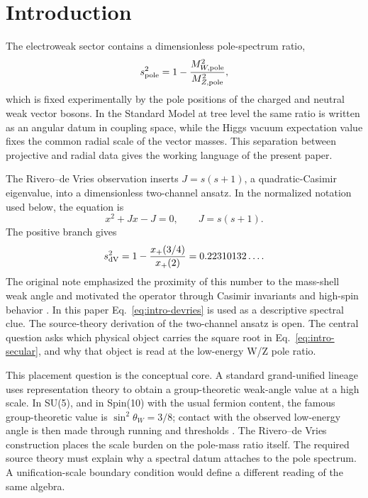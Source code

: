 \section{Introduction}
\label{sec:introduction}

The electroweak sector contains a dimensionless pole-spectrum ratio,
\begin{equation}
  s^2_{\rm pole} = 1-\frac{M_{W,\rm pole}^2}{M_{Z,\rm pole}^2},
  \label{eq:pole-angle-intro}
\end{equation}
which is fixed experimentally by the pole positions of the charged and neutral weak vector bosons.  In the Standard Model at tree level the same ratio is written as an angular datum in coupling space, while the Higgs vacuum expectation value fixes the common radial scale of the vector masses.  This separation between projective and radial data gives the working language of the present paper.

The Rivero--de Vries observation inserts \(J=s(s+1)\), a quadratic-Casimir eigenvalue, into a dimensionless two-channel ansatz.  In the normalized notation used below, the equation is
\begin{equation}
  x^2+Jx-J=0,
  \qquad J=s(s+1).
  \label{eq:intro-secular}
\end{equation}
The positive branch gives
\begin{equation}
  s^2_{\rm dV} = 1-\frac{x_+(3/4)}{x_+(2)}=0.22310132\ldots .
  \label{eq:intro-devries}
\end{equation}
The original note emphasized the proximity of this number to the mass-shell weak angle and motivated the operator through Casimir invariants and high-spin behavior \cite{Rivero2006}.  In this paper Eq.~\eqref{eq:intro-devries} is used as a descriptive spectral clue.  The source-theory derivation of the two-channel ansatz is open.  The central question asks which physical object carries the square root in Eq.~\eqref{eq:intro-secular}, and why that object is read at the low-energy W/Z pole ratio.

This placement question is the conceptual core.  A standard grand-unified lineage uses representation theory to obtain a group-theoretic weak-angle value at a high scale.  In SU(5), and in Spin(10) with the usual fermion content, the famous group-theoretic value is \(\sin^2\theta_W=3/8\); contact with the observed low-energy angle is then made through running and thresholds \cite{Britto2021}.  The Rivero--de Vries construction places the scale burden on the pole-mass ratio itself.  The required source theory must explain why a spectral datum attaches to the pole spectrum.  A unification-scale boundary condition would define a different reading of the same algebra.

